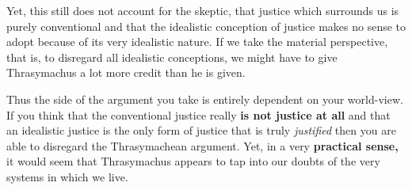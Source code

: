 \documentclass[12pt, letterpaper]{article}
\begin{document}
Yet, this still does not account for the skeptic, that justice which surrounds us is purely conventional and that the idealistic conception of justice makes no sense to adopt because of its very idealistic nature. If we take the material perspective, that is, to disregard all idealistic conceptions, we might have to give Thrasymachus a lot more credit than he is given.

Thus the side of the argument you take is entirely dependent on your world-view. If you think that the conventional justice really \textbf{is not justice at all} and that an idealistic justice is the only form of justice that is truly \textit{justified} then you are able to disregard the Thrasymachean argument. Yet, in a very \textbf{practical sense,} it would seem that Thrasymachus appears to tap into our doubts of the very systems in which we live.
\end{document}
